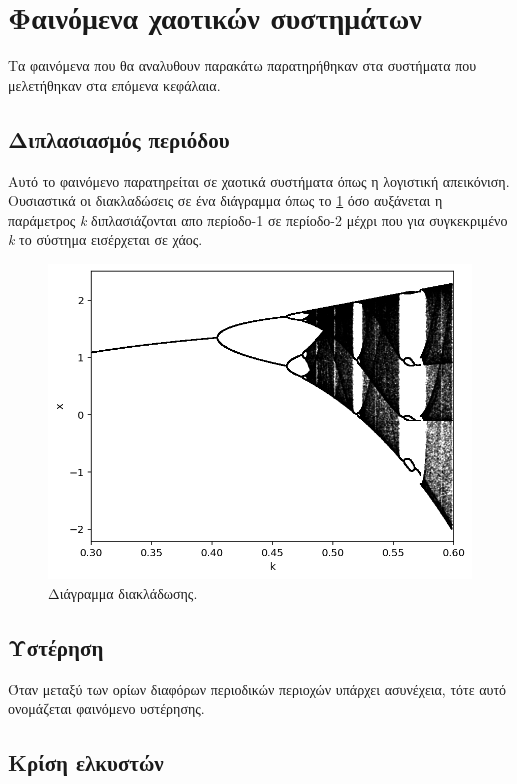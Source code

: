 \section{Φαινόμενα χαοτικών συστημάτων}
Τα φαινόμενα που θα αναλυθουν παρακάτω παρατηρήθηκαν στα συστήματα που μελετήθηκαν στα επόμενα κεφάλαια.

\subsection{Διπλασιασμός περιόδου}

Αυτό το φαινόμενο παρατηρείται σε χαοτικά συστήματα όπως η λογιστική απεικόνιση. Ουσιαστικά οι διακλαδώσεις σε ένα διάγραμμα όπως το \ref{th:g1} όσο αυξάνεται η παράμετρος \emph{k} διπλασιάζονται απο περίοδο-1 σε περίοδο-2 μέχρι που για συγκεκριμένο \emph{k} το σύστημα εισέρχεται σε χάος.


\begin{figure}[ht]
	\centering
	\includegraphics[width=1\linewidth]{LateX images/graphs/g1}
	\caption{ Διάγραμμα διακλάδωσης.}
	\label{th:g1}	
\end{figure}

\subsection{Υστέρηση}
Όταν μεταξύ των ορίων διαφόρων περιοδικών περιοχών υπάρχει ασυνέχεια, τότε αυτό ονομάζεται φαινόμενο υστέρησης.

\subsection{Κρίση ελκυστών}

